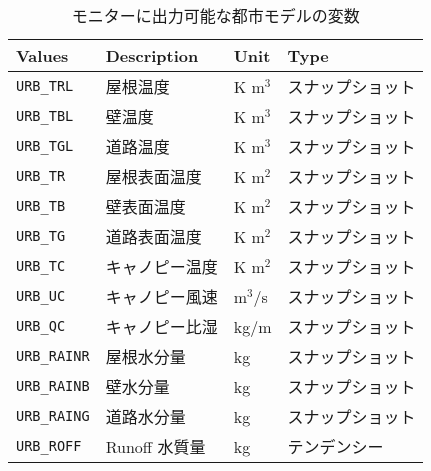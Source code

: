 \begin{table}[h]
\begin{center}
  \caption{モニターに出力可能な都市モデルの変数}
  \label{tab:varlist_monitor_urban}
  \begin{tabularx}{150mm}{|l|X|l|l|} \hline
    \rowcolor[gray]{0.9}  Values & Description & Unit & Type \\ \hline
      \verb|URB_TRL|    & 屋根温度      & K m$^3$ & スナップショット \\
      \verb|URB_TBL|    & 壁温度        & K m$^3$ & スナップショット \\
      \verb|URB_TGL|    & 道路温度      & K m$^3$ & スナップショット \\
      \verb|URB_TR|     & 屋根表面温度  & K m$^2$ & スナップショット \\
      \verb|URB_TB|     & 壁表面温度    & K m$^2$ & スナップショット \\
      \verb|URB_TG|     & 道路表面温度   & K m$^2$ & スナップショット \\
      \verb|URB_TC|     & キャノピー温度 & K m$^2$ & スナップショット \\
      \verb|URB_UC|     & キャノピー風速 & m$^3$/s & スナップショット \\
      \verb|URB_QC|     & キャノピー比湿 & kg/m & スナップショット \\
      \verb|URB_RAINR|  & 屋根水分量    & kg   & スナップショット \\
      \verb|URB_RAINB|  & 壁水分量      & kg   & スナップショット \\
      \verb|URB_RAING|  & 道路水分量    & kg   & スナップショット \\
      \verb|URB_ROFF|   & Runoff 水質量 & kg   & テンデンシー \\
    \hline
  \end{tabularx}
\end{center}
\end{table}


